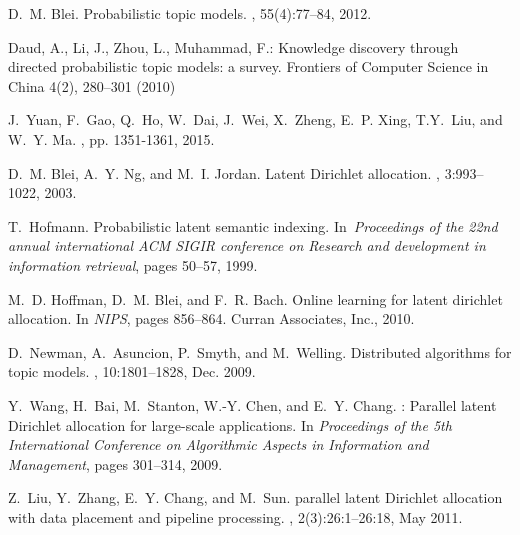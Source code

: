 \documentclass[russian,english]{llncs}
\begin{document}
\begin{thebibliography}{10}

D.~M. Blei.
\newblock Probabilistic topic models.
, 55(4):77--84, 2012.

Daud, A., Li, J., Zhou, L., Muhammad, F.: Knowledge discovery through directed
probabilistic topic models: a survey. Frontiers of Computer Science in China
4(2),  280--301 (2010)


J.~Yuan, F.~Gao, Q.~Ho, W.~Dai, J.~Wei, X.~Zheng, E.~P. Xing, T.Y.~Liu, and W.~Y. Ma.
, pp. 1351-1361, 2015.

D.~M. Blei, A.~Y. Ng, and M.~I. Jordan.
\newblock Latent {Dirichlet} allocation.
, 3:993--1022, 2003.

T.~Hofmann.
\newblock Probabilistic latent semantic indexing.
\newblock In~{\em Proceedings of the 22nd annual international ACM SIGIR
	conference on Research and development in information retrieval},
pages 50--57, 1999.

M.~D. Hoffman, D.~M. Blei, and F.~R. Bach.
\newblock Online learning for latent dirichlet allocation.
\newblock In {\em NIPS}, pages 856--864. Curran Associates, Inc., 2010.

D.~Newman, A.~Asuncion, P.~Smyth, and M.~Welling.
\newblock Distributed algorithms for topic models.
, 10:1801--1828, Dec. 2009.

Y.~Wang, H.~Bai, M.~Stanton, W.-Y. Chen, and E.~Y. Chang.
: Parallel latent {D}irichlet allocation for large-scale applications.
\newblock In {\em Proceedings of the 5th International Conference on
	Algorithmic Aspects in Information and Management}, pages 301--314, 2009.

Z.~Liu, Y.~Zhang, E.~Y. Chang, and M.~Sun.
 parallel latent {D}irichlet allocation with data placement and pipeline processing.
, 2(3):26:1--26:18, May 2011.


\end{thebibliography}
\end{document}
